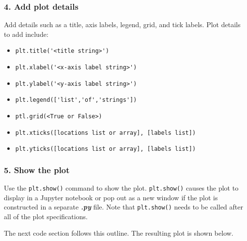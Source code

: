 \documentclass{book}
\providecommand{\tightlist}{%
      \setlength{\itemsep}{0pt}\setlength{\parskip}{0pt}}
\newcommand{\passthrough}[1]{#1}
\begin{document}
\hypertarget{add-plot-details}{%
\subsubsection{4. Add plot details}\label{add-plot-details}}

Add details such as a title, axis labels, legend, grid, and tick labels.
Plot details to add include:

\begin{itemize}
\tightlist
\item
  \passthrough{\lstinline!plt.title('<title string>')!}
\item
  \passthrough{\lstinline!plt.xlabel('<x-axis label string>')!}
\item
  \passthrough{\lstinline!plt.ylabel('<y-axis label string>')!}
\item
  \passthrough{\lstinline!plt.legend(['list','of','strings'])!}
\item
  \passthrough{\lstinline!ptl.grid(<True or False>)!}
\item
  \passthrough{\lstinline!plt.xticks([locations list or array], [labels list])!}
\item
  \passthrough{\lstinline!plt.yticks([locations list or array], [labels list])!}
\end{itemize}

\hypertarget{show-the-plot}{%
\subsubsection{5. Show the plot}\label{show-the-plot}}

Use the \passthrough{\lstinline!plt.show()!} command to show the plot.
\passthrough{\lstinline!plt.show()!} causes the plot to display in a
Jupyter notebook or pop out as a new window if the plot is constructed
in a separate \textbf{\emph{.py}} file. Note that
\passthrough{\lstinline!plt.show()!} needs to be called after all of the
plot specifications.
    




    
        The next code section follows this outline. The resulting plot is shown
below.
    
\end{document}
